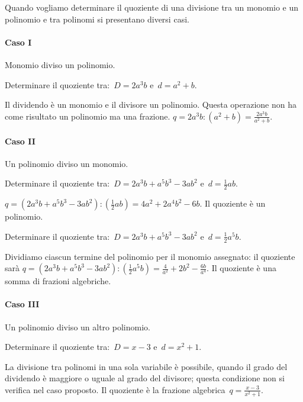 Quando vogliamo determinare il quoziente di una divisione tra un monomio e un 
polinomio e tra polinomi si presentano diversi casi.

\paragraph{Caso I}Monomio diviso un polinomio.
\begin{itemize*}
 \item Determinare il quoziente tra:~\(D=2a^{3}b\) e~\(d=a^{2}+b\).
\end{itemize*}
Il dividendo è un monomio e il divisore un polinomio.
Questa operazione non ha come risultato un polinomio ma una
frazione. \(q=2a^{3}b:\left(a^{2}+b\right)=\frac{2a^{3}b}{a^{2}+b}\).

\paragraph{Caso II}Un polinomio diviso un monomio.
\begin{itemize*}
 \item Determinare il quoziente tra:~\(D=2a^{3}b+a^{5}b^{3}-3ab^{2}\) 
  e~\(d=\frac{1}{2}ab\).
\end{itemize*}
\(q=\left(2a^{3}b+a^{5}b^{3}-3ab^{2}\right):\left(\frac{1}{2}ab\right)=
   4a^{2}+2a^{4}b^{2}-6b\).
Il quoziente è un polinomio.
\begin{itemize*}
 \item Determinare il quoziente tra:~\(D=2a^{3}b+a^{5}b^{3}-3ab^{2}\) 
  e~\(d=\frac{1}{2}a^{5}b\).
\end{itemize*}
Dividiamo ciascun termine del polinomio per il monomio assegnato: il quoziente 
sarà
\(q=\left(2a^{3}b+a^{5}b^{3}-3ab^{2}\right):\left(\frac{1}{2}a^{5}b\right)=
   \frac{4}{a^{2}}+2b^{2}-\frac{6b}{a^{4}}\).
Il quoziente è una somma di frazioni algebriche.

\paragraph{Caso III}Un polinomio diviso un altro polinomio.
\begin{itemize*}
 \item Determinare il quoziente tra:~\(D=x-3\) e~\(d=x^{2}+1\).
\end{itemize*}
La divisione tra polinomi in una sola variabile è possibile, quando il grado 
del dividendo è maggiore o uguale al grado del divisore;
questa condizione non si verifica nel caso proposto.
Il quoziente è la frazione algebrica~\(q=\frac{x-3}{x^{2}+1}\).

